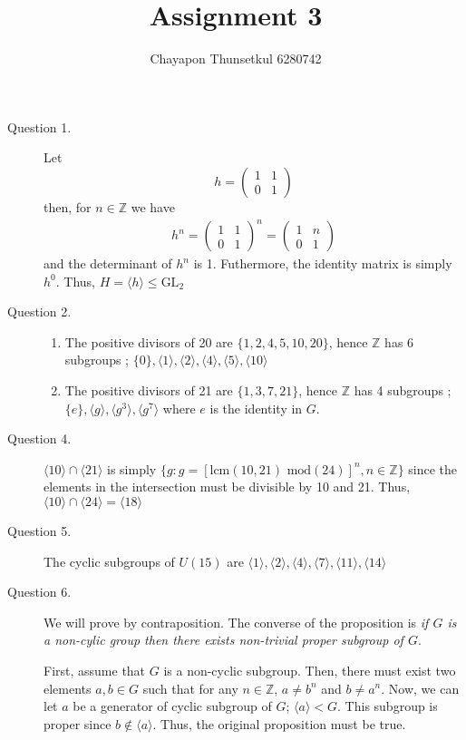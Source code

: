 \documentclass[]{article}
\title{Assignment 3}
\author{Chayapon Thunsetkul 6280742}
\begin{document}
\maketitle
\begin{description}
    \item[Question 1. ] Let $$h = \begin{pmatrix}
        1 & 1 \\ 0 & 1
    \end{pmatrix}$$ then, for $n \in \mathbb{Z}$ we have \begin{align*}
        h^n = \begin{pmatrix}
        1 & 1 \\ 0 & 1
    \end{pmatrix}^n = \begin{pmatrix}
        1 & n \\ 0 & 1
    \end{pmatrix}    \end{align*}  and the determinant of $h^n$ is 1. Futhermore, the identity matrix is simply $h^0$. Thus, $H = \langle h \rangle \leqslant \text{GL}_2$
\item[Question 2. ] \begin{enumerate}
    \item The positive divisors of 20 are $\{1,2,4,5,10,20\}$, hence $\mathbb{Z}$ has 6 subgroups ; $\{0\},\langle 1 \rangle, \langle 2 \rangle,\langle 4 \rangle,\langle 5 \rangle,\langle 10 \rangle$
    \item The positive divisors of 21 are $\{1,3,7,21\}$, hence $\mathbb{Z}$ has 4 subgroups ; $\{e\}, \langle g \rangle , \langle g^{3} \rangle , \langle g^{7} \rangle $ where $e$ is the identity in $G$.
\end{enumerate}
\item[Question 4.] $\langle 10 \rangle \cap \langle 21 \rangle $ is simply $\{g : g = [\text{lcm}(10,21) \text{ mod} (24)]^n , n \in \mathbb{Z}\}$ since the elements in the intersection must be divisible by 10 and 21. Thus, $\langle 10 \rangle \cap \langle 24 \rangle  = \langle 18 \rangle$
\item[Question 5. ] The cyclic subgroups of $U(15)$ are $\langle 1 \rangle,\langle 2 \rangle, \langle 4 \rangle,\langle 7 \rangle,\langle 11 \rangle,\langle 14 \rangle$
\item[Question 6.] We will prove by contraposition. The converse of the proposition is \textit{if $G$ is a non-cylic group then there exists non-trivial proper subgroup of $G$}.

First, assume that $G$ is a non-cyclic subgroup. Then, there must exist two elements $a,b \in G$ such that for any $n \in \mathbb{Z}$, $a \neq b^n$ and $b \neq a^n$. Now, we can let $a$ be a generator of cyclic subgroup of $G$; $\langle a \rangle  < G$. This subgroup is proper since $b \notin \langle a \rangle$. Thus, the original proposition must be true.


\end{description}
\end{document}
